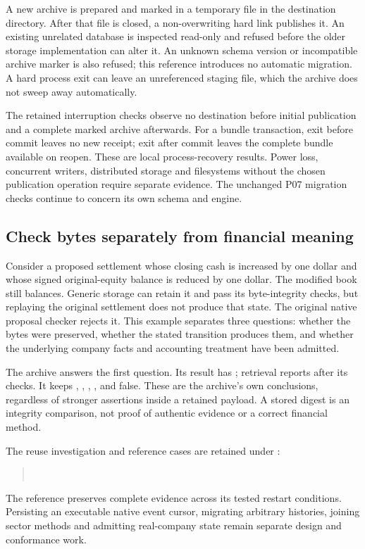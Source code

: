 A new archive is prepared and marked in a temporary file in the destination
directory. After that file is closed, a non-overwriting hard link publishes it.
An existing unrelated database is inspected read-only and refused before the
older storage implementation can alter it. An unknown schema version or
incompatible archive marker is also refused; this reference introduces no
automatic migration. A hard process exit can leave an unreferenced staging file,
which the archive does not sweep away automatically.

The retained interruption checks observe no destination before initial
publication and a complete marked archive afterwards. For a bundle transaction,
exit before commit leaves no new receipt; exit after commit leaves the complete
bundle available on reopen. These are local process-recovery results. Power
loss, concurrent writers, distributed storage and filesystems without the chosen
publication operation require separate evidence. The unchanged P07 migration
checks continue to concern its own schema and engine.

\subsection{Check bytes separately from financial meaning}

Consider a proposed settlement whose closing cash is increased by one dollar
and whose signed original-equity balance is reduced by one dollar. The modified
book still balances. Generic storage can retain it and pass its byte-integrity
checks, but replaying the original settlement does not produce that state. The
original native proposal checker rejects it. This example separates three
questions: whether the bytes were preserved, whether the stated transition
produces them, and whether the underlying company facts and accounting treatment
have been admitted.

The archive answers the first question. Its result has ;
retrieval reports  after its checks. It keeps
, , ,
,  and 
false. These are the archive's own conclusions, regardless of stronger assertions
inside a retained payload. A stored digest is an integrity comparison, not proof
of authentic evidence or a correct financial method.

The reuse investigation and reference cases are retained under
:
\begin{quote}\small
{}\\
\end{quote}
The reference preserves complete evidence across its tested restart conditions.
Persisting an executable native event cursor, migrating arbitrary histories,
joining sector methods and admitting real-company state remain separate design
and conformance work.



